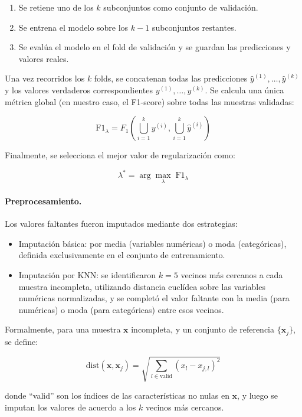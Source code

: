 \documentclass[11pt]{article}
\begin{document}
\begin{enumerate}
    \item Se retiene uno de los $k$ subconjuntos como conjunto de validación.
    \item Se entrena el modelo sobre los $k-1$ subconjuntos restantes.
    \item Se evalúa el modelo en el fold de validación y se guardan las predicciones y valores reales.
\end{enumerate}

Una vez recorridos los $k$ folds, se concatenan todas las predicciones $\hat{y}^{(1)}, \ldots, \hat{y}^{(k)}$ y los valores verdaderos correspondientes $y^{(1)}, \ldots, y^{(k)}$. Se calcula una única métrica global (en nuestro caso, el F1-score) sobre todas las muestras validadas:

\[
\text{F1}_\lambda = F_1\left( \bigcup_{i=1}^k y^{(i)}, \bigcup_{i=1}^k \hat{y}^{(i)} \right)
\]

Finalmente, se selecciona el mejor valor de regularización como:

\[
\lambda^* = \arg\max_\lambda \; \text{F1}_\lambda
\]

\paragraph{Preprocesamiento.}

Los valores faltantes fueron imputados mediante dos estrategias:
\begin{itemize}
    \item Imputación básica: por media (variables numéricas) o moda (categóricas), definida exclusivamente en el conjunto de entrenamiento.
    \item Imputación por KNN: se identificaron $k=5$ vecinos más cercanos a cada muestra incompleta, utilizando distancia euclídea sobre las variables numéricas normalizadas, y se completó el valor faltante con la media (para numéricas) o moda (para categóricas) entre esos vecinos.
\end{itemize}

Formalmente, para una muestra $\mathbf{x}$ incompleta, y un conjunto de referencia $\{\mathbf{x}_j\}$, se define:

\[
\text{dist}(\mathbf{x}, \mathbf{x}_j) = \sqrt{ \sum_{l \in \text{valid}} (x_l - x_{j,l})^2 }
\]

donde “valid” son los índices de las características no nulas en $\mathbf{x}$, y luego se imputan los valores de acuerdo a los $k$ vecinos más cercanos.
\end{document}
